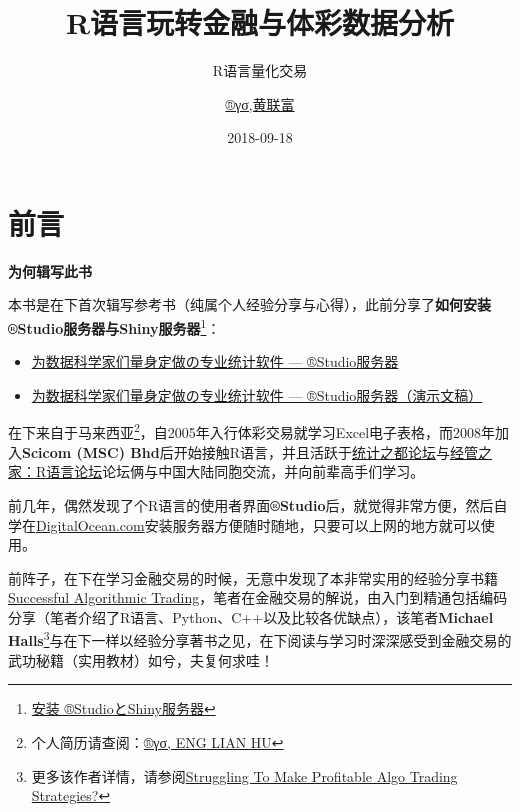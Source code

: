 \documentclass[]{book}
\title{R语言玩转金融与体彩数据分析}
\subtitle{R语言量化交易}
\author{\href{https://beta.rstudioconnect.com/content/3091/ryo-eng.html}{®γσ,黄联富}}
\date{2018-09-18}
\providecommand{\tightlist}{%
  \setlength{\itemsep}{0pt}\setlength{\parskip}{0pt}}
\let\rmarkdownfootnote\footnote%
\def\footnote{\protect\rmarkdownfootnote}
\theoremstyle{definition}
\theoremstyle{definition}
\theoremstyle{definition}
\theoremstyle{remark}
\begin{document}
\maketitle

{
\setcounter{tocdepth}{1}
\tableofcontents
}
\chapter{前言}\label{preface}

\textbf{为何辑写此书}

本书是在下首次辑写参考书（纯属个人经验分享与心得），此前分享了\textbf{如何安装®Studio服务器与Shiny服务器}\footnote{\href{https://github.com/scibrokes/setup-rstudio-server}{安装
  ®StudioとShiny服务器}}：

\begin{itemize}
\tightlist
\item
  \href{https://beta.rstudioconnect.com/englianhu/Introducing-RStudio-Server-for-Data-Scientists/Introducing-RStudio-Server-for-Data-Scientists.html}{为数据科学家们量身定做の专业统计软件
  --- ®Studio服务器}
\item
  \href{https://beta.rstudioconnect.com/englianhu/Introducing-RStudio-Server-for-Data-Scientists-Slides/Introducing-RStudio-Server-for-Data-Scientists-slides.html}{为数据科学家们量身定做の专业统计软件
  --- ®Studio服务器（演示文稿）}
\end{itemize}

在下来自于马来西亚\footnote{个人简历请查阅：\href{https://beta.rstudioconnect.com/content/3091/ryo-eng.html}{®γσ,
  ENG LIAN HU}}，自2005年入行体彩交易就学习Excel电子表格，而2008年加入\textbf{Scicom
(MSC)
Bhd}后开始接触R语言，并且活跃于\href{https://d.cosx.org}{统计之都论坛}与\href{http://bbs.pinggu.org/forum-69-1.html}{经管之家：R语言论坛}论坛俩与中国大陆同胞交流，并向前辈高手们学习。

前几年，偶然发现了个R语言的使用者界面\textbf{®Studio}后，就觉得非常方便，然后自学在\href{https://m.do.co/c/aabb124120d0}{DigitalOcean.com}安装服务器方便随时随地，只要可以上网的地方就可以使用。

前阵子，在下在学习金融交易的时候，无意中发现了本非常实用的经验分享书籍\href{https://raw.githubusercontent.com/englianhu/binary.com-interview-question/master/reference/Successful\%20Algorithmic\%20Trading.pdf}{Successful
Algorithmic
Trading}，笔者在金融交易的解说，由入门到精通包括编码分享（笔者介绍了R语言、Python、C++以及比较各优缺点），该笔者\textbf{Michael
Halls}\footnote{更多该作者详情，请参阅\href{https://www.quantstart.com/successful-algorithmic-trading-ebook}{Struggling
  To Make Profitable Algo Trading Strategies?}}与在下一样以经验分享著书之见，在下阅读与学习时深深感受到金融交易的武功秘籍（实用教材）如兮，夫复何求哇！
\end{document}
